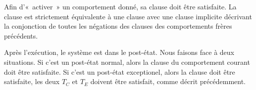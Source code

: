 Afin d'«~activer~» un comportement donné, sa clause \arequires doit être
satisfaite. La clause \adefault est strictement équivalente à une clause
\abehavior avec une clause \arequires implicite décrivant la conjonction de
toutes les négations des clauses \arequires des comportements frères précédents.

Après l'exécution, le système est dans le post-état. Nous faisons face à deux
situations. Si c'est un post-état normal, alors la clause \aensures du
comportement courant doit être satisfaite. Si c'est un post-état exceptionel,
alors la clause \athrowable doit être satisfaite, \ie les deux $T_C$ et $T_E$
doivent être satisfait, comme décrit précédemment.
